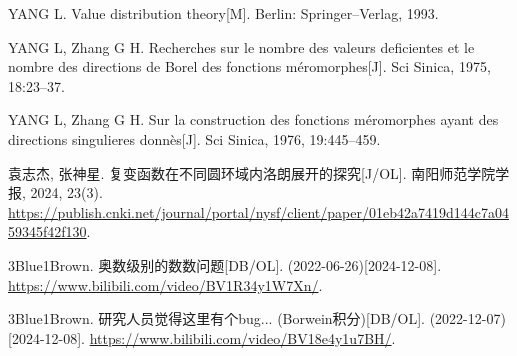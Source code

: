 \begin{thebibliography}{99}
	YANG L.
	Value distribution theory[M].
	Berlin: Springer--Verlag, 1993.

	YANG L, Zhang G H.
	Recherches sur le nombre des valeurs deficientes et le nombre des directions de Borel des fonctions m\'eromorphes[J].
	Sci Sinica, 1975, 18:23--37.

	YANG L, Zhang G H.
	Sur la construction des fonctions m\'eromorphes ayant des directions singulieres donn\`es[J]. Sci Sinica, 1976, 19:445--459.

	袁志杰, 张神星.
	复变函数在不同圆环域内洛朗展开的探究[J/OL].
	南阳师范学院学报, 2024, 23(3).
	\url{https://publish.cnki.net/journal/portal/nysf/client/paper/01eb42a7419d144c7a0459345f42f130}.

	3Blue1Brown.
	奥数级别的数数问题[DB/OL].
	(2022-06-26)[2024-12-08].
	\url{https://www.bilibili.com/video/BV1R34y1W7Xn/}.

	3Blue1Brown.
	研究人员觉得这里有个bug... (Borwein积分)[DB/OL].
	(2022-12-07)[2024-12-08].
	\url{https://www.bilibili.com/video/BV18e4y1u7BH/}.

	
\end{thebibliography}
